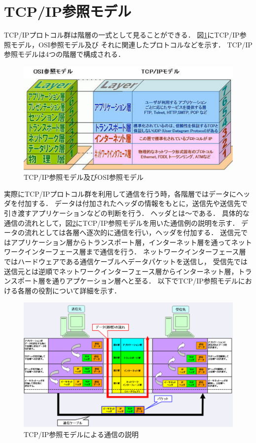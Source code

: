 \documentclass[12pt]{jreport}
\begin{document}
\section{TCP/IP参照モデル}

TCP/IPプロトコル群は階層の一式として見ることができる．
図\ref{fig:tcp_ip_ref_model}にTCP/IP参照モデル，OSI参照モデル及び
それに関連したプロトコルなどを示す．
TCP/IP参照モデルは4つの階層で構成される．

\begin{figure}[bt]
 \centering
 \includegraphics[width=\columnwidth]{figure/tcp_ip_ref_model.pdf}
 \caption{TCP/IP参照モデル及びOSI参照モデル}
 \label{fig:tcp_ip_ref_model}
\end{figure}

実際にTCP/IPプロトコル群を利用して通信を行う時，各階層ではデータにヘッダを付加する．
データは付加されたヘッダの情報をもとに，送信先や送信先で引き渡すアプリケーションなどの判断を行う．
ヘッダとは〜である．
具体的な通信の流れとして，図\ref{fig:tcp_ip_comm}にTCP/IP参照モデルを用いた通信例の説明を示す．
データの流れとしては各層へ逐次的に通信を行い，ヘッダを付加する．
送信元ではアプリケーション層からトランスポート層，インターネット層を通ってネットワークインターフェース層まで通信を行う．
ネットワークインターフェース層ではハードウェアである通信ケーブルへデータパケットを送信し，
受信先では送信元とは逆順でネットワークインターフェース層からインターネット層，トランスポート層を通りアプケーション層へと至る．
以下でTCP/IP参照モデルにおける各層の役割について詳細を示す．

\begin{figure}[bt]
 \centering
 \includegraphics[width=\columnwidth]{figure/tcp_ip_comm.pdf}
 \caption{TCP/IP参照モデルによる通信の説明}
 \label{fig:tcp_ip_comm}
\end{figure}
\end{document}
